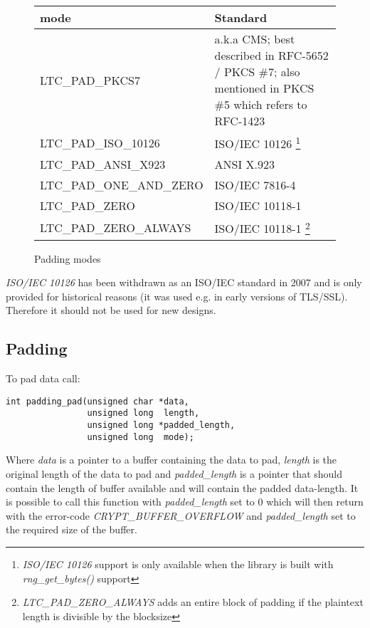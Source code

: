 \documentclass[synpaper]{book}
\begin{document}
\begin{figure}[H]
\begin{minipage}{\textwidth}
\begin{center}
\begin{tabular}{|l|l|}
     \hline \textbf{mode} & \textbf{Standard} \\
     \hline LTC\_PAD\_PKCS7  & a.k.a CMS; best described in RFC-5652 / PKCS \#7; also mentioned in PKCS \#5 which refers to RFC-1423 \\
     \hline LTC\_PAD\_ISO\_10126 & ISO/IEC 10126 \footnote{\textit{ISO/IEC 10126} support is only available when the library is built with \textit{rng\_get\_bytes()} support} \\
     \hline LTC\_PAD\_ANSI\_X923 & ANSI X.923 \\
     \hline LTC\_PAD\_ONE\_AND\_ZERO & ISO/IEC 7816-4 \\
     \hline LTC\_PAD\_ZERO & ISO/IEC 10118-1 \\
     \hline LTC\_PAD\_ZERO\_ALWAYS & ISO/IEC 10118-1 \footnote{\textit{LTC\_PAD\_ZERO\_ALWAYS} adds an entire block of padding if the plaintext length is divisible by the blocksize} \\
     \hline
\end{tabular}
\end{center}
\end{minipage}
\caption{Padding modes}
\label{fig:paddingmodes}
\end{figure}

\textit{ISO/IEC 10126} has been withdrawn as an ISO/IEC standard in 2007 and is only provided for historical reasons (it was used e.g. in early versions of TLS/SSL).
Therefore it should not be used for new designs.


\subsection{Padding}

To pad data call:

\begin{verbatim}
int padding_pad(unsigned char *data,
                unsigned long  length,
                unsigned long *padded_length,
                unsigned long  mode);
\end{verbatim}

Where \textit{data} is a pointer to a buffer containing the data to pad,
\textit{length} is the original length of the data to pad and
\textit{padded\_length} is a pointer that should contain the length of buffer available and will contain the padded data-length.
It is possible to call this function with \textit{padded\_length} set to $0$ which will then return with the error-code \textit{CRYPT\_BUFFER\_OVERFLOW}
and \textit{padded\_length} set to the required size of the buffer.
\end{document}
